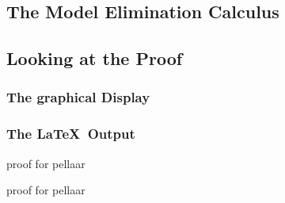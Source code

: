 \subsection{The Model Elimination Calculus}

\subsection{Looking at the Proof}
\subsubsection{The graphical Display}
\subsubsection{The \LaTeX\ Output}

\begin{table}[htb]
proof for pellaar
\caption{proof for pellaar}
\label{tab:started:nonob-proof}
\end{table}

